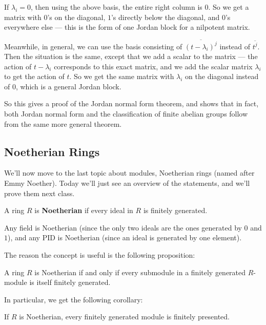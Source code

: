 If $\lambda_i = 0$, then using the above basis, the entire right column is $0$. So we get a matrix with $0$'s on the diagonal, $1$'s directly below the diagonal, and $0$'s everywhere else --- this is the form of one Jordan block for a nilpotent matrix.  

Meanwhile, in general, we can use the basis consisting of $\overline{(t - \lambda_i)^j}$ instead of $\overline{t^j}$. Then the situation is the same, except that we add a scalar to the matrix --- the action of $t - \lambda_i$ corresponds to this exact matrix, and we add the scalar matrix $\lambda_i$ to get the action of $t$. So we get the same matrix with $\lambda_i$ on the diagonal instead of $0$, which is a general Jordan block. 

So this gives a proof of the Jordan normal form theorem, and shows that in fact, both Jordan normal form and the classification of finite abelian groups follow from the same more general theorem. 

\subsection{Noetherian Rings}

We'll now move to the last topic about modules, Noetherian rings (named after Emmy Noether). Today we'll just see an overview of the statements, and we'll prove them next class. 

\begin{definition}
    A ring $R$ is \textbf{Noetherian} if every ideal in $R$ is finitely generated. 
\end{definition}

\begin{example}
    Any field is Noetherian (since the only two ideals are the ones generated by $0$ and $1$), and any PID is Noetherian (since an ideal is generated by one element). 
\end{example}

The reason the concept is useful is the following proposition:

\begin{proposition}
    A ring $R$ is Noetherian if and only if every submodule in a finitely generated $R$-module is itself finitely generated. 
\end{proposition}

In particular, we get the following corollary:

\begin{corollary}
    If $R$ is Noetherian, every finitely generated module is finitely presented. 
\end{corollary}

